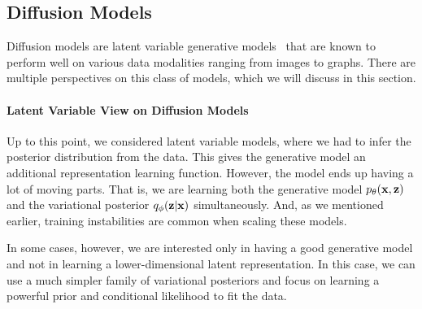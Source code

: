 \subsection{Diffusion Models}\label{sec:intro_diffusion}
Diffusion models are latent variable generative models~\cite{ho2020denoising, huang2021variational, kingma2021variational, tzen2019neural} that are known to perform well on various data modalities ranging from images to graphs. There are multiple perspectives on this class of models, which we will discuss in this section. 

\paragraph{Latent Variable View on Diffusion Models}
Up to this point, we considered latent variable models, where we had to infer the posterior distribution from the data. 
This gives the generative model an additional representation learning function. 
However, the model ends up having a lot of moving parts. 
That is, we are learning both the generative model $p_{\theta}({\mathbf{x}}, {\mathbf{z}})$ and the variational posterior $q_{\phi}({\mathbf{z}}|{\mathbf{x}})$ simultaneously.  
And, as we mentioned earlier, training instabilities are common when scaling these models. 

In some cases, however, we are interested only in having a good generative model and not in learning a lower-dimensional latent representation. 
In this case, we can use a much simpler family of variational posteriors and focus on learning a powerful prior and conditional likelihood to fit the data.  

